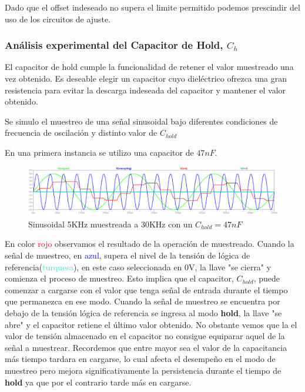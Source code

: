 Dado que el offset indeseado no supera el limite permitido podemos prescindir del uso de los circuitos de ajuste.

\subsubsection{Análisis experimental del Capacitor de Hold, $C_{h}$}
El capacitor de hold cumple la funcionalidad de retener el valor muestreado una vez obtenido. Es deseable elegir un capacitor cuyo dieléctrico ofrezca una gran resistencia para evitar la descarga indeseada del capacitor y mantener el valor obtenido.

Se simulo el muestreo de una señal sinusoidal bajo diferentes condiciones de frecuencia de oscilación y distinto valor de $C_{hold}$

En una primera instancia se utilizo una capacitor de $47nF$. 
\begin{figure}[H]
	\centering
	\includegraphics[width=\linewidth]{ImagenesEjercicio4/ChTests/Vin1_30ksamplig47nF}
	\caption{Sinusoidal 5KHz muestreada a 30KHz con un $C_{hold}=47nF$}
	\label{fig:vin130ksamplig47nf}
\end{figure}
En color \textcolor{red}{rojo} observamos el resultado de la operación de muestreado. 
Cuando la señal de muestreo, en \textcolor{blue}{azul}, supera el nivel de la tensión de lógica de referencia(\textcolor{turquoise}{turquesa}), en este caso seleccionada en 0V, la llave "se cierra" y comienza el proceso de muestreo. Esto implica que el capacitor, $C_{hold}$, puede comenzar a cargarse con el valor que tenga señal de entrada durante el tiempo que permanezca en ese modo. Cuando la señal de muestreo se encuentra por debajo de la tensión lógica de referencia se ingresa al modo \textbf{hold}, la llave "se abre" y el capacitor retiene el último valor obtenido. No obstante vemos que la el valor de tensión almacenado en el capacitor no consigue equiparar aquel de la señal a muestrear. Recordemos que entre mayor sea el valor de la capacitancia más tiempo tardara en cargarse, lo cual afecta el desempeño en el modo de muestreo pero mejora significativamente la persistencia durante el tiempo de \textbf{hold} ya que por el contrario tarde más en cargarse.

